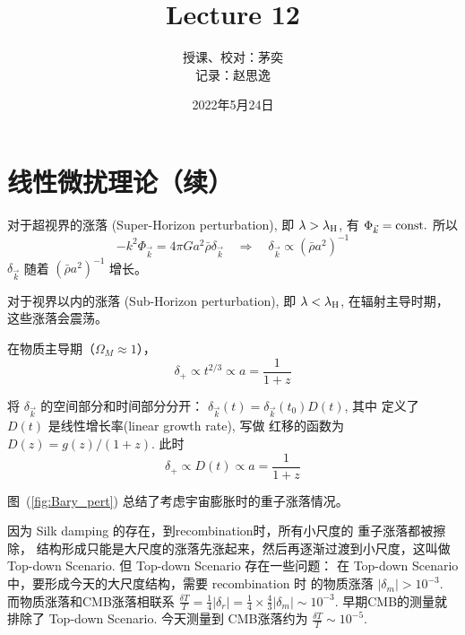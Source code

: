 \documentclass[12pt]{ctexart}
\title{Lecture 12}
\author{授课、校对：茅奕  \\ 记录：赵思逸}
\date{2022年5月24日}
\newcommand{\reffig}[1]{图~(\ref{#1})}
\begin{document}
\maketitle

\section{线性微扰理论（续）}



对于超视界的涨落 (Super-Horizon perturbation), 即 $\lambda > \lambda_{\rm{H}}$,
有 $\Phi_{\vec{k}}=\rm{const.}$
所以 
\begin{equation}
    -k^{2} \Phi_{\vec{k}}=4 \pi G a^{2} \bar{\rho} \delta_{\vec{k}} \quad \Rightarrow \quad \delta_{\vec{k}} \propto\left(\bar{\rho} a^{2}\right)^{-1}
\end{equation}
$\delta_{\vec{k}}$ 随着 $\left(\bar{\rho} a^{2}\right)^{-1}$ 增长。

对于视界以内的涨落 (Sub-Horizon perturbation), 即 $\lambda < \lambda_{\rm{H}}$, 在辐射主导时期，这些涨落会震荡。


在物质主导期（$\Omega_M\approx 1$），
\begin{equation}
    \delta_{+}  \propto  t^{2/3} \propto a =\frac{1}{1+z}
\end{equation}

将 $\delta_{\vec{k}}$   的空间部分和时间部分分开： $\delta_{\vec{k}}(t) = \delta_{\vec{k}}(t_0) D(t)$, 其中 定义了 $D(t)$ 是线性增长率(linear growth rate), 写做 红移的函数为 $D(z)=g(z)/(1+z)$.
此时 
\begin{equation}
    \delta_{+} \propto D(t) \propto a =\frac{1}{1+z}
\end{equation}



\reffig{fig:Bary_pert} 总结了考虑宇宙膨胀时的重子涨落情况。

因为 Silk damping 的存在，到recombination时，所有小尺度的 重子涨落都被擦除，
结构形成只能是大尺度的涨落先涨起来，然后再逐渐过渡到小尺度，这叫做
Top-down Scenario.
但 Top-down Scenario
存在一些问题：
在 Top-down Scenario 中，要形成今天的大尺度结构，需要 recombination 时
的物质涨落 $|\delta_m|> 10^{-3}$. 
而物质涨落和CMB涨落相联系
$\frac{\delta T}{T}=\frac{1}{4} |\delta_r| = \frac{1}{4} \times \frac{4}{3} |\delta_m| \sim 10^{-3}$.
早期CMB的测量就排除了 Top-down Scenario. 今天测量到 CMB涨落约为 
$\frac{\delta T}{T} \sim 10^{-5}$.
\end{document}
